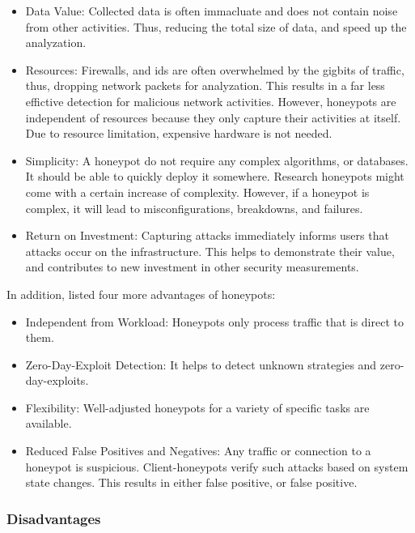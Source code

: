 \begin{itemize}
    \item Data Value: Collected data is often immacluate and does not contain noise from other activities.
          Thus, reducing the total size of data, and speed up the analyzation.
    \item Resources: Firewalls, and \ac{ids} are often overwhelmed by the gigbits of traffic, thus, dropping network packets for analyzation.
          This results in a far less effictive detection for malicious network activities.
          However, honeypots are independent of resources because they only capture their activities at itself.
          Due to resource limitation, expensive hardware is not needed.
    \item Simplicity: A honeypot do not require any complex algorithms, or databases.
          It should be able to quickly deploy it somewhere.
          Research honeypots might come with a certain increase of complexity. However, if a honeypot is complex, it will lead to misconfigurations, breakdowns, and failures.
    \item Return on Investment: Capturing attacks immediately informs users that attacks occur on the infrastructure.
          This helps to demonstrate their value, and contributes to new investment in other security measurements.
\end{itemize}

In addition, \citet{NawrockiWSKS2016} listed four more advantages of honeypots:

\begin{itemize}
    \item Independent from Workload: Honeypots only process traffic that is direct to them.
    \item Zero-Day-Exploit Detection: It helps to detect unknown strategies and zero-day-exploits.
    \item Flexibility: Well-adjusted honeypots for a variety of specific tasks are available.
    \item Reduced False Positives and Negatives: Any traffic or connection to a honeypot is suspicious.
          Client-honeypots verify such attacks based on system state changes.
          This results in either false positive, or false positive.
\end{itemize}

\subsubsection{Disadvantages}

